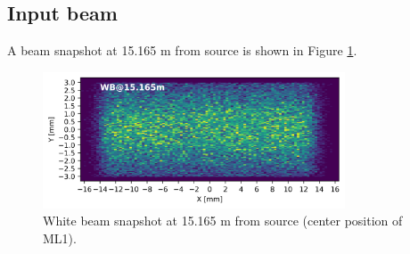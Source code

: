 \subsection{Input beam}
A beam snapshot at 15.165 m from source is shown in Figure \ref{fig:snapshot_ML1}.
\begin{figure}[ht]
\centering
\includegraphics[width=0.8\textwidth]{./../../beam_snapshots/WB_snapshot_15.165.png}
\caption{\label{fig:snapshot_ML1} White beam snapshot at 15.165 m from source (center position of ML1).}
\end{figure}

